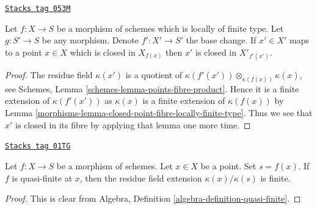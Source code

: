 \begin{lemma}
\label{morphisms-lemma-base-change-closed-point-fibre-locally-finite-type}
\href{https://stacks.math.columbia.edu/tag/053M}{\texttt{Stacks tag 053M}}

Let $f : X \to S$ be a morphism of schemes which is locally of finite type.
Let $g : S' \to S$ be any morphism. Denote $f' : X' \to S'$ the base change.
If $x' \in X'$ maps to a point $x \in X$ which is closed in $X_{f(x)}$
then $x'$ is closed in $X'_{f'(x')}$.
\end{lemma}

\begin{proof}

The residue field $\kappa(x')$ is a quotient of
$\kappa(f'(x')) \otimes_{\kappa(f(x))} \kappa(x)$, see
Schemes, Lemma \ref{schemes-lemma-points-fibre-product}.
Hence it is a finite extension of $\kappa(f'(x'))$ as
$\kappa(x)$ is a finite extension of $\kappa(f(x))$ by
Lemma \ref{morphisms-lemma-closed-point-fibre-locally-finite-type}.
Thus we see that $x'$ is closed in its fibre by applying that lemma
one more time.
\end{proof}

\begin{lemma}
\label{morphisms-lemma-residue-field-quasi-finite}
\href{https://stacks.math.columbia.edu/tag/01TG}{\texttt{Stacks tag 01TG}}

Let $f : X \to S$ be a morphism of schemes.
Let $x \in X$ be a point. Set $s = f(x)$.
If $f$ is quasi-finite at $x$, then the residue field
extension $\kappa(x)/\kappa(s)$ is finite.
\end{lemma}

\begin{proof}
This is clear from Algebra, Definition \ref{algebra-definition-quasi-finite}.
\end{proof}

